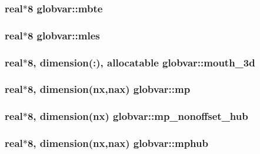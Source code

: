 \subsubsection[{mbte}]{\setlength{\rightskip}{0pt plus 5cm}real$\ast$8 globvar\+::mbte}\label{namespaceglobvar_a9f55e62c22dc5aef4a6167ef140b95d4}
\hypertarget{namespaceglobvar_aadf047ab1c784bfc190712db2f3d8500}{}
\subsubsection[{mles}]{\setlength{\rightskip}{0pt plus 5cm}real$\ast$8 globvar\+::mles}\label{namespaceglobvar_aadf047ab1c784bfc190712db2f3d8500}
\hypertarget{namespaceglobvar_aca439d842ea97d1d7e30e6e925fddd19}{}
\subsubsection[{mouth\+\_\+3d}]{\setlength{\rightskip}{0pt plus 5cm}real$\ast$8, dimension(\+:), allocatable globvar\+::mouth\+\_\+3d}\label{namespaceglobvar_aca439d842ea97d1d7e30e6e925fddd19}
\hypertarget{namespaceglobvar_a4616d2799c88911e5e46e57902cfa3a2}{}
\subsubsection[{mp}]{\setlength{\rightskip}{0pt plus 5cm}real$\ast$8, dimension({\bf nx},{\bf nax}) globvar\+::mp}\label{namespaceglobvar_a4616d2799c88911e5e46e57902cfa3a2}
\hypertarget{namespaceglobvar_a9cc33a73476cd269f28f4637663baa64}{}
\subsubsection[{mp\+\_\+nonoffset\+\_\+hub}]{\setlength{\rightskip}{0pt plus 5cm}real$\ast$8, dimension({\bf nx}) globvar\+::mp\+\_\+nonoffset\+\_\+hub}\label{namespaceglobvar_a9cc33a73476cd269f28f4637663baa64}
\hypertarget{namespaceglobvar_a7278f73f6facd43ef016ecdef108b3b8}{}
\subsubsection[{mphub}]{\setlength{\rightskip}{0pt plus 5cm}real$\ast$8, dimension({\bf nx},{\bf nax}) globvar\+::mphub}\label{namespaceglobvar_a7278f73f6facd43ef016ecdef108b3b8}
\hypertarget{namespaceglobvar_ae10e04d6629f2c844f1e0613142003da}{}
